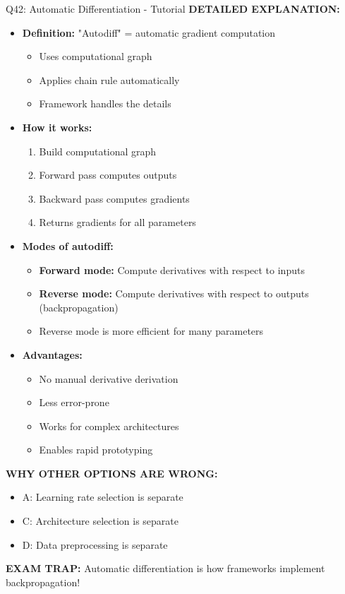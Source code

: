 \documentclass[8pt]{beamer}
\begin{document}
\begin{frame}{Q42: Automatic Differentiation - Tutorial}
		\vspace{0.05cm}
		\textbf{DETAILED EXPLANATION:}
		\begin{itemize}
			\item \textbf{Definition:} "Autodiff" = automatic gradient computation
			\begin{itemize}
				\item Uses computational graph
				\item Applies chain rule automatically
				\item Framework handles the details
			\end{itemize}
			\item \textbf{How it works:}
			\begin{enumerate}
				\item Build computational graph
				\item Forward pass computes outputs
				\item Backward pass computes gradients
				\item Returns gradients for all parameters
			\end{enumerate}
			\item \textbf{Modes of autodiff:}
			\begin{itemize}
				\item \textbf{Forward mode:} Compute derivatives with respect to inputs
				\item \textbf{Reverse mode:} Compute derivatives with respect to outputs (backpropagation)
				\item Reverse mode is more efficient for many parameters
			\end{itemize}
			\item \textbf{Advantages:}
			\begin{itemize}
				\item No manual derivative derivation
				\item Less error-prone
				\item Works for complex architectures
				\item Enables rapid prototyping
			\end{itemize}
		\end{itemize}
		
		\vspace{0.05cm}
		\textcolor{myred}{\textbf{WHY OTHER OPTIONS ARE WRONG:}}
		\begin{itemize}
			\item \textcolor{myred}{A:} Learning rate selection is separate
			\item \textcolor{myred}{C:} Architecture selection is separate
			\item \textcolor{myred}{D:} Data preprocessing is separate
		\end{itemize}
		
		\textcolor{myred}{\textbf{EXAM TRAP:}} Automatic differentiation is how frameworks implement \textcolor{myblue}{backpropagation}!
	\end{frame}
	
\end{document}
